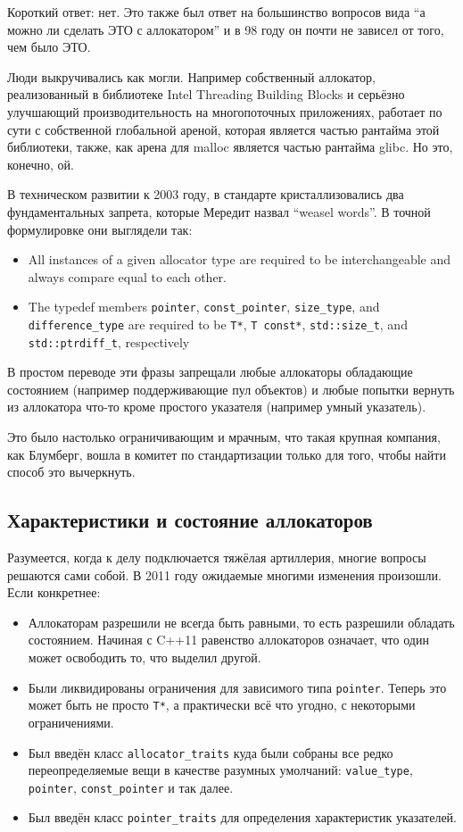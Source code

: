 \documentclass[a4paper,12pt,oneside]{book}
\begin{document}
Короткий ответ: нет. Это также был ответ на большинство вопросов вида ``а можно ли сделать ЭТО с аллокатором'' и в 98 году он почти не зависел от того, чем было ЭТО.

Люди выкручивались как могли. Например собственный аллокатор, реализованный в библиотеке Intel Threading Building Blocks и серьёзно улучшающий производительность на многопоточных приложениях, работает по сути с собственной глобальной ареной, которая является частью рантайма этой библиотеки, также, как арена для malloc является частью рантайма glibc. Но это, конечно, ой.

В техническом развитии к 2003 году, в стандарте кристаллизовались два фундаментальных запрета, которые Мередит назвал ``weasel words''. В точной формулировке они выглядели так:

\begin{itemize}
\item All instances of a given allocator type are required to be interchangeable and always compare equal to each other.
\item The typedef members \lstinline!pointer!, \lstinline!const_pointer!, \lstinline!size_type!, and \lstinline!difference_type! are required to be \lstinline!T*!, \lstinline!T const*!, \lstinline!std::size_t!, and \lstinline!std::ptrdiff_t!, respectively 
\end{itemize}

В простом переводе эти фразы запрещали любые аллокаторы обладающие состоянием (например поддерживающие пул объектов) и любые попытки вернуть из аллокатора что-то кроме простого указателя (например умный указатель).

Это было настолько ограничивающим и мрачным, что такая крупная компания, как Блумберг, вошла в комитет по стандартизации только для того, чтобы найти способ это вычеркнуть.

\subsection{Характеристики и состояние аллокаторов}\label{sub:statefull}

Разумеется, когда к делу подключается тяжёлая артиллерия, многие вопросы решаются сами собой. В 2011 году ожидаемые многими изменения произошли. Если конкретнее:

\begin{itemize}
\item Аллокаторам разрешили не всегда быть равными, то есть разрешили обладать состоянием. Начиная с C++11 равенство аллокаторов означает, что один может освободить то, что выделил другой.
\item Были ликвидированы ограничения для зависимого типа \lstinline!pointer!. Теперь это может быть не просто \lstinline!T*!, а практически всё что угодно, с некоторыми ограничениями.
\item Был введён класс \lstinline!allocator_traits! куда были собраны все редко переопределяемые вещи в качестве разумных умолчаний: \lstinline!value_type!, \lstinline!pointer!, \lstinline!const_pointer! и так далее.
\item Был введён класс \lstinline!pointer_traits! для определения характеристик указателей.
\end{itemize}
\end{document}
